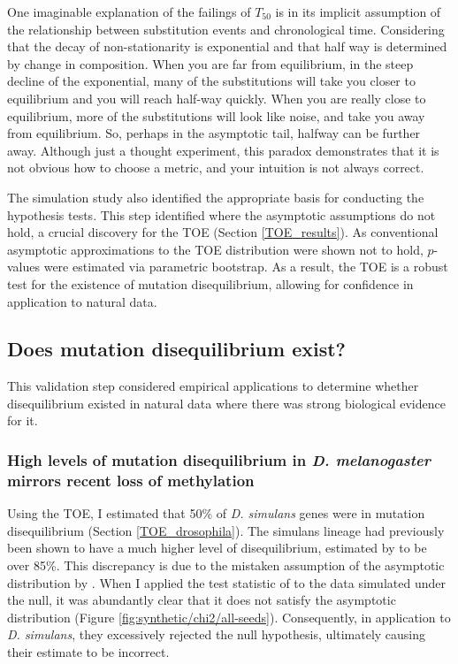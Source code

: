 One imaginable explanation of the failings of $T_{50}$ is in its implicit assumption of the relationship between substitution events and chronological time. Considering that the decay of non-stationarity is exponential and that half way is determined by change in composition. When you are far from equilibrium, in the steep decline of the exponential, many of the substitutions will take you closer to equilibrium and you will reach half-way quickly. When you are really close to equilibrium, more of the substitutions will look like noise, and take you away from equilibrium. So, perhaps in the asymptotic tail, halfway can be further away. Although just a thought experiment, this paradox demonstrates that it is not obvious how to choose a metric, and your intuition is not always correct. 

The simulation study also identified the appropriate basis for conducting the hypothesis tests. This step identified where the asymptotic assumptions do not hold, a crucial discovery for the TOE (Section \ref{TOE_results}). As conventional asymptotic approximations to the TOE distribution were shown not to hold, $p$-values were estimated via parametric bootstrap. As a result, the TOE is a robust test for the existence of mutation disequilibrium, allowing for confidence in application to natural data. 

\subsection{Does mutation disequilibrium exist?}

This validation step considered empirical applications to determine whether disequilibrium existed in natural data where there was strong biological evidence for it.

\subsubsection{High levels of mutation disequilibrium in \textit{D. melanogaster} mirrors recent loss of methylation}
Using the TOE, I estimated that 50\% of \textit{D. simulans} genes were in mutation disequilibrium (Section \ref{TOE_drosophila}). The simulans lineage had previously been shown to have a much higher level of disequilibrium, estimated by \cite{Squartini2008QuantifyingProcess} to be over 85\%. This discrepancy is due to the mistaken assumption of the asymptotic distribution by \cite{Squartini2008QuantifyingProcess}. When I applied the test statistic of \cite{Squartini2008QuantifyingProcess} to the data simulated under the null, it was abundantly clear that it does not satisfy the asymptotic distribution (Figure \ref{fig:synthetic/chi2/all-seeds}). Consequently, in application to \textit{D. simulans}, they excessively rejected the null hypothesis, ultimately causing their estimate to be incorrect.

